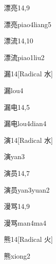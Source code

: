 \begin{entry}{漂亮}{14,9}
  \begin{phonetics}{漂亮}{piao4liang5}
  \end{phonetics}
\end{entry}

\begin{entry}{漂流}{14,10}
  \begin{phonetics}{漂流}{piao1liu2}
  \end{phonetics}
\end{entry}

\begin{entry}{漏}{14}[Radical 水]
  \begin{phonetics}{漏}{lou4}
  \end{phonetics}
\end{entry}

\begin{entry}{漏电}{14,5}
  \begin{phonetics}{漏电}{lou4dian4}
  \end{phonetics}
\end{entry}

\begin{entry}{演}{14}[Radical 水]
  \begin{phonetics}{演}{yan3}
  \end{phonetics}
\end{entry}

\begin{entry}{演员}{14,7}
  \begin{phonetics}{演员}{yan3yuan2}
  \end{phonetics}
\end{entry}

\begin{entry}{漫骂}{14,9}
  \begin{phonetics}{漫骂}{man4ma4}
  \end{phonetics}
\end{entry}

\begin{entry}{熊}{14}[Radical 火]
  \begin{phonetics}{熊}{xiong2}
  \end{phonetics}
\end{entry}

